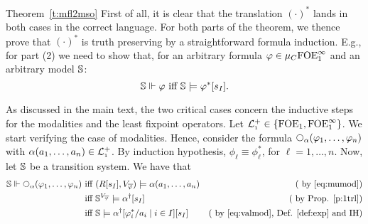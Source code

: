 \begin{proofof}{Theorem~\ref{t:mfl2mso}}
First of all, it is clear that the translation $(\cdot)^{*}$ lands in both cases in the correct language.
For both parts of the theorem, we thence prove that $(\cdot)^{*}$ is truth preserving 
by a straightforward formula induction.
E.g., for part (2) we need to show that, for an arbitrary formula $\varphi\in
\mu_{C}\mathrm{FOE}^{\infty}_1$ and an arbitrary model $\mathbb{S}$:
\begin{equation}
\label{eq:xxxx1}
\model \mmodels \phi \text{ iff } \model \models \phi^{*}[s_{I}].
\end{equation}

As discussed in the main text, the two critical cases concern the inductive 
steps for the modalities and the least fixpoint operators. Let $ \mathcal{L}_{\scriptscriptstyle 1}^{+} \in \{\mathrm{FOE}_1,\mathrm{FOE}^{\infty}_1\}$.
We start verifying the case of modalities. Hence, consider the formula $\nxt{\al}(\varphi_{1},\ldots,\varphi_{n})$ with $\alpha(a_{1},\ldots,a_{n}) \in \mathcal{L}_{\scriptscriptstyle 1}^{+}$. By induction hypothesis, $\phi_\ell \equiv \phi^{*}_\ell$, for $\ell=1, \dots, n$. Now, let $\mathbb{S}$ be a transition system. We have that
\begin{align*}
\model \mmodels \nxt{\al}(\varphi_{1},\ldots,\varphi_{n}) \text{ iff } & (R[s_{I}],V_{\overline{\varphi}}) \models \al(a_{1},\ldots,a_{n})  & \text{( by \eqref{eq:mumod})}
\\
\text{ iff } & \model^{V_{\overline{\varphi}}} \models \al^{\dag}[s_{I}] & \text{( by Prop. \ref{p:1trl})}
\\
\text{ iff } & \model \models \al^{\dag}[\phi_{i}^{*}/a_{i} \mid i \in I][s_{I}] & \text{( by \eqref{eq:valmod}, Def. \ref{def:exp} and IH)}
\end{align*}


\end{proofof}

